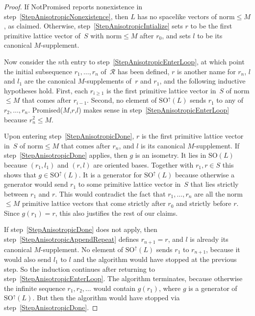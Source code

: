 \documentclass[12pt]{amsart}
\def\calR{\mathcal{R}}
\def\SO{\mathrm{SO}}
\def\SOup{\SO^{\uparrow}}
\def\SOup{\mathrm{SO}^{\uparrow}}
\numberwithin{theorem}{section}
\numberwithin{equation}{section}
\numberwithin{figure}{section}
\theoremstyle{remark}
\begin{document}
\begin{proof}
    If {\sf NotPromised} reports nonexistence in step~\ref{StepAnisotropicNonexistence}, then $L$ has no
    spacelike vectors of norm${}\leq M$, as claimed.  
    Otherwise, step~\ref{StepAnisotropicIntialize} sets $r$ to be
    the first primitive lattice vector of~$S$ with norm${}\leq M$ after $r_0$,
    and sets $l$ to be its canonical $M$-supplement. 

    Now consider the $n$th entry to step~\ref{StepAnisotropicEnterLoop},
    at which point the initial subsequence $r_1,\dots,r_n$ of~$\calR$
    has been defined, $r$ is another name for $r_n$, $l$ and $l_1$
    are  the canonical $M$-supplements of~$r$ and $r_1$,
    and the following inductive hypotheses hold.
    First, each $r_{i\geq1}$ is the first primitive lattice vector in~$S$ of norm${}\leq M$
    that comes after $r_{i-1}$.  
    Second, no element of $\SOup(L)$ sends $r_1$ to any of $r_2,\dots,r_n$.
    {\sf Promised($M$,$r$,$l$)} makes sense in step~\ref{StepAnisotropicEnterLoop} because $r_n^2\leq M$.

    Upon entering step~\ref{StepAnisotropicDone},
    $r$ is the first primitive lattice vector in~$S$ of norm${}\leq M$ that
    comes after $r_n$, and $l$ is its canonical $M$-supplement.  If
    step~\ref{StepAnisotropicDone} applies, then $g$ is an isometry.  It lies in $\SO(L)$ because 
    $(r_1,l_1)$ and $(r,l)$ are oriented bases.  Together with $r_1,r\in S$
    this shows that $g\in\SOup(L)$.  It is a generator for $\SOup(L)$
    because otherwise a generator would send $r_1$ to some primitive lattice
    vector in~$S$ that lies strictly between $r_1$ and $r$.  This would contradict
    the  fact that $r_1,\dots,r_n$ are
    all the norm${}\leq M$ primitive lattice vectors that come strictly after $r_0$ and
    strictly before $r$.  Since $g(r_1)=r$, this also justifies the rest of our claims.

    If step~\ref{StepAnisotropicDone} does not apply, then step~\ref{StepAnisotropicAppendRepeat} defines
    $r_{n+1}=r$, and $l$ is already its canonical  $M$-supplement.  No element
    of $\SOup(L)$ sends $r_1$ to $r_{n+1}$, because it would also send
    $l_1$ to $l$   and the algorithm would have stopped at the previous step.  So the
    induction continues after returning to step~\ref{StepAnisotropicEnterLoop}.  The algorithm
    terminates, because otherwise the infinite sequence $r_1,r_2,\dots$ would
    contain $g(r_1)$, where $g$ is a generator of $\SOup(L)$.  But then the
    algorithm would have stopped via step~\ref{StepAnisotropicDone}.
\end{proof}
\end{document}

